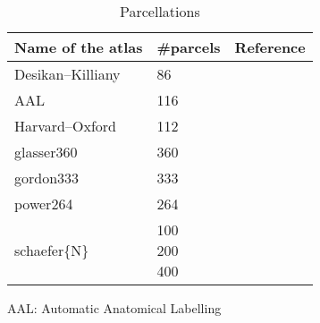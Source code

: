 \renewcommand\cellset{\renewcommand\arraystretch{0.5}%
    \setlength\extrarowheight{0pt}}
\begin{table}[bt]
    \scriptsize
    \begin{threeparttable}
        \begin{subtable}[t]{.525\textwidth}
            \label{tab:parcellations}
            \begin{tabularx}{\textwidth}{l l l}
                \toprule
                \textbf{Name of the atlas}  & \textbf{\#parcels}                                  & \textbf{Reference}          \\
                \midrule
                Desikan--Killiany           & \num{86}                                            & \cite{desikan2006automated} \\
                AAL                         & \num{116}                                           & \cite{tzourio2002automated} \\
                Harvard--Oxford             & \num{112}                                           & \cite{makris2006decreased}  \\
                glasser360                  & \num{360}                                           & \cite{Glasser2016-ia}       \\
                gordon333                   & \num{333}                                           & \cite{Gordon2016-wy}        \\
                power264                    & \num{264}                                           & \cite{Power2011-xf}         \\
                schaefer\{N\}               & \makecell[lt]{\num{100} \\ \num{200}\\ \num{400}}   & \cite{Schaefer2018-bo}      \\
                \bottomrule
            \end{tabularx}
            \begin{tablenotes}
                \item{AAL:} Automatic Anatomical Labelling
            \end{tablenotes}
            \caption{Parcellations}
        \end{subtable}
        \qquad
        \begin{subtable}[t]{.425\textwidth}
            \label{tab:parcellations}

\end{subtable}
\end{threeparttable}
\end{table}
